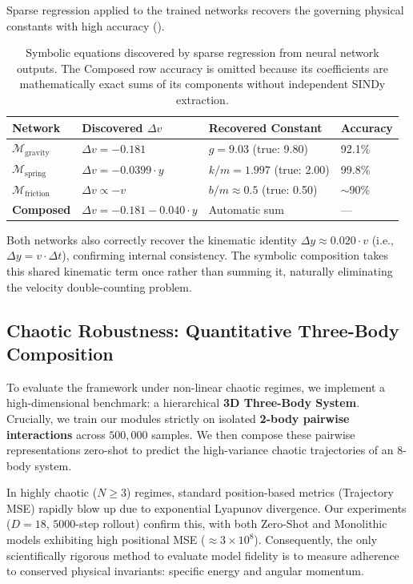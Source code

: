 \documentclass[twoside,11pt]{article}
\begin{document}
Sparse regression applied to the trained networks recovers the governing physical constants with high accuracy ().

\begin{table}[h]
\centering
\caption{Symbolic equations discovered by sparse regression from neural network outputs. The Composed row accuracy is omitted because its coefficients are mathematically exact sums of its components without independent SINDy extraction.}
\label{tab:sindy}
\begin{tabular}{@{}llll@{}}
\toprule
Network & Discovered $\Delta v$ & Recovered Constant & Accuracy \\
\midrule
$\mathcal{M}_\text{gravity}$ & $\Delta v = -0.181$ & $g = 9.03$ (true: 9.80) & 92.1\% \\
$\mathcal{M}_\text{spring}$ & $\Delta v = -0.0399 \cdot y$ & $k/m = 1.997$ (true: 2.00) & 99.8\% \\
$\mathcal{M}_\text{friction}$ & $\Delta v \propto -v$ & $b/m \approx 0.5$ (true: 0.50) & $\sim$90\% \\
\midrule
\textbf{Composed} & $\Delta v = -0.181 - 0.040 \cdot y$ & Automatic sum & --- \\
\bottomrule
\end{tabular}
\end{table}
Both networks also correctly recover the kinematic identity $\Delta y \approx 0.020 \cdot v$ (i.e., $\Delta y = v \cdot \Delta t$), confirming internal consistency. The symbolic composition takes this shared kinematic term once rather than summing it, naturally eliminating the velocity double-counting problem.

\subsection{Chaotic Robustness: Quantitative Three-Body Composition}
To evaluate the framework under non-linear chaotic regimes, we implement a high-dimensional benchmark: a hierarchical \textbf{3D Three-Body System}. Crucially, we train our modules strictly on isolated \textbf{2-body pairwise interactions} across $500,000$ samples. We then compose these pairwise representations zero-shot to predict the high-variance chaotic trajectories of an 8-body system.

In highly chaotic ($N \ge 3$) regimes, standard position-based metrics (Trajectory MSE) rapidly blow up due to exponential Lyapunov divergence. Our experiments ($D=18$, $5000$-step rollout) confirm this, with both Zero-Shot and Monolithic models exhibiting high positional MSE ($\approx 3 \times 10^8$). Consequently, the only scientifically rigorous method to evaluate model fidelity is to measure adherence to conserved physical invariants: specific energy and angular momentum.
\end{document}
